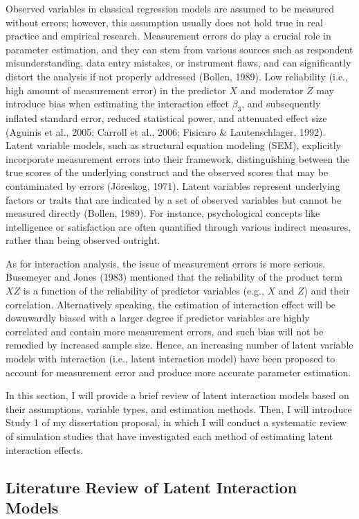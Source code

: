 \documentclass[
  man]{apa6}
\begin{document}
Observed variables in classical regression models are assumed to be measured without errors; however, this assumption usually does not hold true in real practice and empirical research. Measurement errors do play a crucial role in parameter estimation, and they can stem from various sources such as respondent misunderstanding, data entry mistakes, or instrument flaws, and can significantly distort the analysis if not properly addressed (Bollen, 1989). Low reliability (i.e., high amount of measurement error) in the predictor \(X\) and moderator \(Z\) may introduce bias when estimating the interaction effect \(\beta_{3}\), and subsequently inflated standard error, reduced statistical power, and attenuated effect size (Aguinis et al., 2005; Carroll et al., 2006; Fisicaro \& Lautenschlager, 1992). Latent variable models, such as structural equation modeling (SEM), explicitly incorporate measurement errors into their framework, distinguishing between the true scores of the underlying construct and the observed scores that may be contaminated by errors (Jöreskog, 1971). Latent variables represent underlying factors or traits that are indicated by a set of observed variables but cannot be measured directly (Bollen, 1989). For instance, psychological concepts like intelligence or satisfaction are often quantified through various indirect measures, rather than being observed outright.

As for interaction analysis, the issue of measurement errors is more serious. Busemeyer and Jones (1983) mentioned that the reliability of the product term \(XZ\) is a function of the reliability of predictor variables (e.g., \(X\) and \(Z\)) and their correlation. Alternatively speaking, the estimation of interaction effect will be downwardly biased with a larger degree if predictor variables are highly correlated and contain more measurement errors, and such bias will not be remedied by increased sample size. Hence, an increasing number of latent variable models with interaction (i.e., latent interaction model) have been proposed to account for measurement error and produce more accurate parameter estimation.

In this section, I will provide a brief review of latent interaction models based on their assumptions, variable types, and estimation methods. Then, I will introduce Study 1 of my dissertation proposal, in which I will conduct a systematic review of simulation studies that have investigated each method of estimating latent interaction effects.

\hypertarget{literature-review-of-latent-interaction-models}{%
\subsection{Literature Review of Latent Interaction Models}\label{literature-review-of-latent-interaction-models}}
\end{document}
